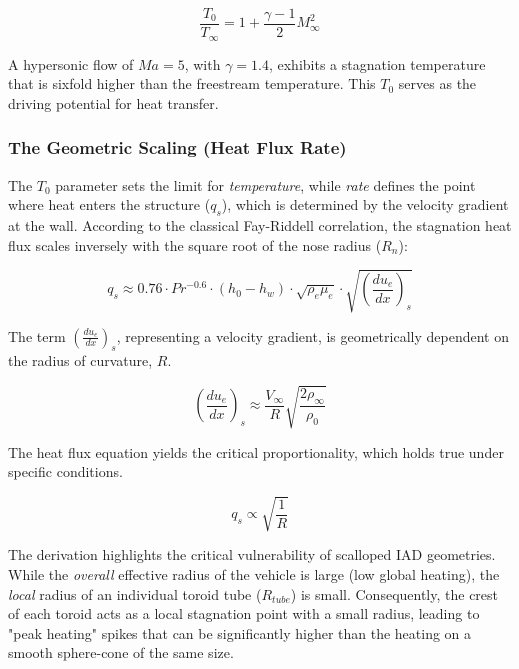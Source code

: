 \begin{equation}
    \frac{T_0}{T_{\infty}} = 1 + \frac{\gamma - 1}{2} M_{\infty}^2
\end{equation}

A hypersonic flow of $Ma=5$, with $\gamma=1.4$, exhibits a stagnation temperature that is sixfold higher than the freestream temperature. This $T_0$ serves as the driving potential for heat transfer.

\subsubsection*{The Geometric Scaling (Heat Flux Rate)}
The $T_0$ parameter sets the limit for \textit{temperature}, while \textit{rate} defines the point where heat enters the structure ($q_s$), which is determined by the velocity gradient at the wall. According to the classical Fay-Riddell correlation, the stagnation heat flux scales inversely with the square root of the nose radius ($R_n$):

\begin{equation}
    q_s \approx 0.76 \cdot Pr^{-0.6} \cdot (h_{0} - h_w) \cdot \sqrt{\rho_e \mu_e} \cdot \sqrt{\left( \frac{du_e}{dx} \right)_s}
\end{equation}

The term $\left( \frac{du_e}{dx} \right)_s$, representing a velocity gradient, is geometrically dependent on the radius of curvature, $R$.

\begin{equation}
    \left( \frac{du_e}{dx} \right)_s \approx \frac{V_{\infty}}{R} \sqrt{\frac{2 \rho_{\infty}}{\rho_{0}}}
\end{equation}

The heat flux equation yields the critical proportionality, which holds true under specific conditions.

\begin{equation}
    q_s \propto \sqrt{\frac{1}{R}}
\end{equation}

The derivation highlights the critical vulnerability of scalloped IAD geometries. While the \textit{overall} effective radius of the vehicle is large (low global heating), the \textit{local} radius of an individual toroid tube ($R_{tube}$) is small. Consequently, the crest of each toroid acts as a local stagnation point with a small radius, leading to "peak heating" spikes that can be significantly higher than the heating on a smooth sphere-cone of the same size.

